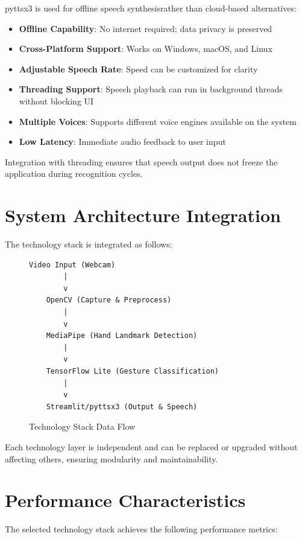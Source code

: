 pyttsx3 is used for offline speech synthesisrather than cloud-based alternatives:

\begin{itemize}
    \item \textbf{Offline Capability}: No internet required; data privacy is preserved
    \item \textbf{Cross-Platform Support}: Works on Windows, macOS, and Linux
    \item \textbf{Adjustable Speech Rate}: Speed can be customized for clarity
    \item \textbf{Threading Support}: Speech playback can run in background threads without blocking UI
    \item \textbf{Multiple Voices}: Supports different voice engines available on the system
    \item \textbf{Low Latency}: Immediate audio feedback to user input
\end{itemize}

Integration with threading ensures that speech output does not freeze the application during recognition cycles.

\section{System Architecture Integration}

The technology stack is integrated as follows:

\begin{figure}[H]
\centering
\begin{verbatim}
Video Input (Webcam)
        |
        v
    OpenCV (Capture & Preprocess)
        |
        v
    MediaPipe (Hand Landmark Detection)
        |
        v
    TensorFlow Lite (Gesture Classification)
        |
        v
    Streamlit/pyttsx3 (Output & Speech)
\end{verbatim}
\caption{Technology Stack Data Flow}
\end{figure}

Each technology layer is independent and can be replaced or upgraded without affecting others, ensuring modularity and maintainability.

\section{Performance Characteristics}

The selected technology stack achieves the following performance metrics:

